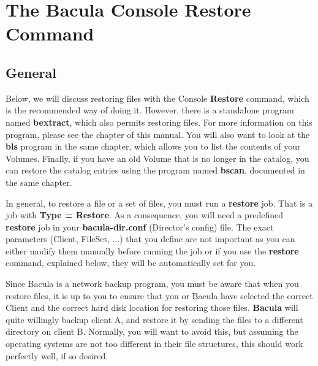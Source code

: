 
\section*{The Bacula Console Restore Command}
\label{_ChapterStart13}

\subsection*{General}

Below, we will discuss restoring files with the Console {\bf Restore} command,
which is the recommended way of doing it. However, there is a standalone
program named {\bf bextract}, which also permits restoring files. For more
information on this program, please see the 
 chapter of this manual.
You will also want to look at the {\bf bls} program in the same chapter, which
allows you to list the contents of your Volumes. Finally, if you have an old
Volume that is no longer in the catalog, you can restore the catalog entries
using the program named {\bf bscan}, documented in the same 
 chapter. 

In general, to restore a file or a set of files, you must run a {\bf restore}
job. That is a job with {\bf Type = Restore}. As a consequence, you will need
a predefined {\bf restore} job in your {\bf bacula-dir.conf} (Director's
config) file. The exact parameters (Client, FileSet, ...) that you define are
not important as you can either modify them manually before running the job or
if you use the {\bf restore} command, explained below, they will be
automatically set for you. 

Since Bacula is a network backup program, you must be aware that when you
restore files, it is up to you to ensure that you or Bacula have selected the
correct Client and the correct hard disk location for restoring those files.
{\bf Bacula} will quite willingly backup client A, and restore it by sending
the files to a different directory on client B. Normally, you will want to
avoid this, but assuming the operating systems are not too different in their
file structures, this should work perfectly well, if so desired. 
\label{Example1}


